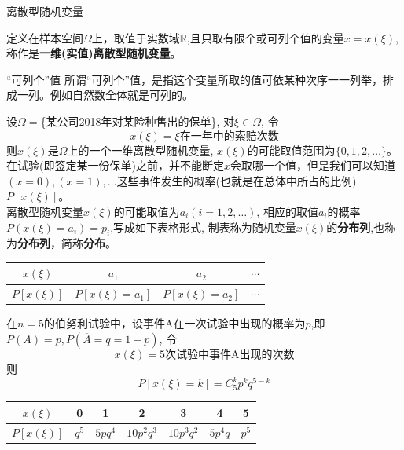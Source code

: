 \begin{frame}{离散型随机变量}
\begin{definition}[离散型随机变量]
	定义在样本空间$\Omega$上，取值于实数域$\mathbb{R}$,且只取有限个或可列个值的变量$x=x(\xi)$, 称作是\textbf{一维(实值)离散型随机变量}。\\
\end{definition}
\begin{block}{``可列个''值}
	所谓``可列个''值，是指这个变量所取的值可依某种次序一一列举，排成一列。例如自然数全体就是可列的。
\end{block}
\end{frame}

\begin{frame}
\begin{example}
	设$\Omega=$\{某公司2018年对某险种售出的保单\}, 对$\xi\in\Omega$, 令
	\[x(\xi)=\xi\text{在一年中的索赔次数}\]
	则$x(\xi)$是$\Omega$上的一个一维离散型随机变量, $x(\xi)$的可能取值范围为$\{0,1,2,\dots\}$。 在试验(即签定某一份保单)之前，并不能断定$x$会取哪一个值，但是我们可以知道$(x=0),(x=1),\dots$这些事件发生的概率(也就是在总体中所占的比例)$P[x(\xi)]$。\\
	离散型随机变量$x(\xi)$的可能取值为$a_i(i=1,2,\dots)$, 相应的取值$a_i$的概率$P(x(\xi)=a_i)=p_i$,写成如下表格形式, 制表称为随机变量$x(\xi)$的\textbf{分布列},也称为\textbf{分布列}，简称\textbf{分布}。\\
	\centering
	\begin{tabular}{|c|c|c|c|}
		\hline 
		$x(\xi)$ & $a_1$ & $a_2$ & $\cdots$\\ 
		\hline 
		$P[x(\xi)]$ & $P[x(\xi)=a_1]$ & $P[x(\xi)=a_2]$ & $\cdots$\\ 
		\hline 
	\end{tabular} 
\end{example}
\end{frame}

\begin{frame}
\begin{example}
	在$n=5$的伯努利试验中，设事件A在一次试验中出现的概率为$p$,即$P(A)=p,P(\overline{A}=q=1-p)$, 令
	\[x(\xi)=\text{5次试验中事件A出现的次数}\]
	则
	\[P[x(\xi)=k]=C_5^kp^kq^{5-k} \]
	\centering
		\begin{tabular}{|c|c|c|c|c|c|c|}
		\hline 
		$x(\xi)$ & 0 & 1 & 2 & 3 & 4 & 5\\ 
		\hline 
		$P[x(\xi)]$ & $q^5$ & $5pq^4$ & $10p^2q^3$ & $10p^3q^2$ & $5p^4q$ & $p^5$\\	\hline 
	\end{tabular} 	
\end{example}
\end{frame}


